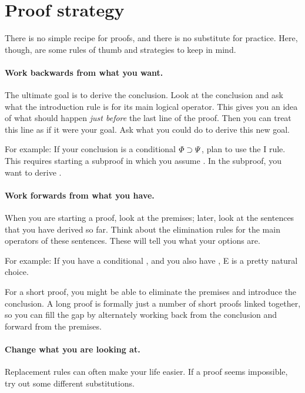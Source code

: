 \section{Proof strategy}
\label{sec.SL.ND.strategy}





There is no simple recipe for proofs, and there is no substitute for practice. Here, though, are some rules of thumb and strategies to keep in mind.

\paragraph{Work backwards from what you want.}
The ultimate goal is to derive the conclusion. Look at the conclusion and ask what the introduction rule is for its main logical operator. This gives you an idea of what should happen \emph{just before} the last line of the proof. Then you can treat this line as if it were your goal. Ask what you could do to derive this new goal.

For example: If your conclusion is a conditional $\varPhi{}\supset\varPsi{}$, plan to use the {\eif}I rule. This requires starting a subproof in which you assume \metaA{}. In the subproof, you want to derive \metaB{}.

\paragraph{Work forwards from what you have.}
When you are starting a proof, look at the premises; later, look at the sentences that you have derived so far. Think about the elimination rules for the main operators of these sentences. These will tell you what your options are.

For example: If you have a conditional \metaA{}\eif\metaB{}, and you also have \metaA{}, {\eif}E is a pretty natural choice.

For a short proof, you might be able to eliminate the premises and introduce the conclusion. A long proof is formally just a number of short proofs linked together, so you can fill the gap by alternately working back from the conclusion and forward from the premises.


\paragraph{Change what you are looking at.}
Replacement rules can often make your life easier. If a proof seems impossible, try out some different substitutions.

